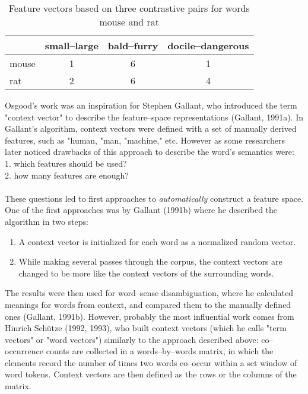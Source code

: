\begin{table}[h!]
\begin{center}
\begin{tabular}{ l | c c c  }
   &  small--large & bald--furry& docile--dangerous\\
  \hline                       
  mouse & 1 & 6 & 1\\
  rat & 2 & 6 & 4 \\
\end{tabular}
\caption{Feature vectors based on three contrastive pairs for words mouse and rat}
\end{center}
\end{table}
Osgood's work was an inspiration for Stephen Gallant, who introduced the term "context vector" to
describe the feature--space representations (Gallant, 1991a). In Gallant's algorithm, context vectors were defined with a set of manually derived features, such as "human, "man, "machine," etc. However as some researchers later noticed drawbacks of this approach to describe the word's semantics were:
\\1. which features should be used?	
\\2. how many features are enough?
\\\\  These questions led to first approaches to \textit{automatically} construct a feature space. One of the first approaches was by Gallant (1991b) where he described the algorithm in two steps:
\begin{enumerate}
\item A context vector is initialized for each word as a normalized random vector.
\item While making several passes through the corpus, the context vectors are changed to be more like the context vectors of the surrounding words.
\end{enumerate}
The results were then used for word--sense disambiguation, where he calculated meanings for words from context, and compared them to the manually defined ones (Gallant, 1991b). However, probably the most influential work comes from Hinrich Sch\"utze (1992, 1993), who built context vectors (which he calls "term vectors" or "word vectors") similarly to the approach described above: co--occurrence counts are collected in a words--by--words matrix, in which the elements record the number of times two words co--occur within a set window of word tokens. Context vectors are then defined as the rows or the columns of the matrix.

